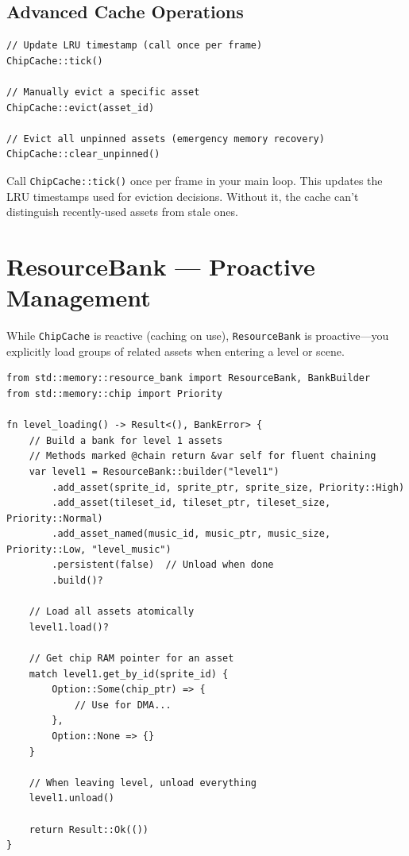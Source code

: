\subsection{Advanced Cache Operations}

\begin{lstlisting}
// Update LRU timestamp (call once per frame)
ChipCache::tick()

// Manually evict a specific asset
ChipCache::evict(asset_id)

// Evict all unpinned assets (emergency memory recovery)
ChipCache::clear_unpinned()
\end{lstlisting}

\begin{tipbox}
Call \texttt{ChipCache::tick()} once per frame in your main loop. This updates the LRU timestamps used for eviction decisions. Without it, the cache can't distinguish recently-used assets from stale ones.
\end{tipbox}

\section{ResourceBank --- Proactive Management}
\label{sec:resource-bank}

While \texttt{ChipCache} is reactive (caching on use), \texttt{ResourceBank} is proactive---you explicitly load groups of related assets when entering a level or scene.

\begin{lstlisting}
from std::memory::resource_bank import ResourceBank, BankBuilder
from std::memory::chip import Priority

fn level_loading() -> Result<(), BankError> {
    // Build a bank for level 1 assets
    // Methods marked @chain return &var self for fluent chaining
    var level1 = ResourceBank::builder("level1")
        .add_asset(sprite_id, sprite_ptr, sprite_size, Priority::High)
        .add_asset(tileset_id, tileset_ptr, tileset_size, Priority::Normal)
        .add_asset_named(music_id, music_ptr, music_size, Priority::Low, "level_music")
        .persistent(false)  // Unload when done
        .build()?

    // Load all assets atomically
    level1.load()?

    // Get chip RAM pointer for an asset
    match level1.get_by_id(sprite_id) {
        Option::Some(chip_ptr) => {
            // Use for DMA...
        },
        Option::None => {}
    }

    // When leaving level, unload everything
    level1.unload()

    return Result::Ok(())
}
\end{lstlisting}

